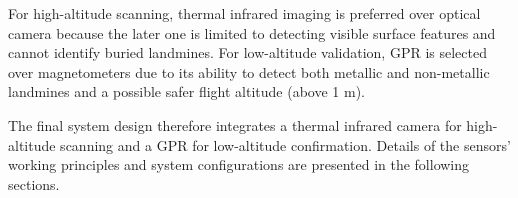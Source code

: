 For high-altitude scanning, thermal infrared imaging is preferred over optical camera because the later one is limited to detecting visible surface features and cannot identify buried landmines. For low-altitude validation, GPR is selected over magnetometers due to its ability to detect both metallic and non-metallic landmines and a possible safer flight altitude (above 1 m).

The final system design therefore integrates a thermal infrared camera for high-altitude scanning and a GPR for low-altitude confirmation. Details of the sensors' working principles and system configurations are presented in the following sections.